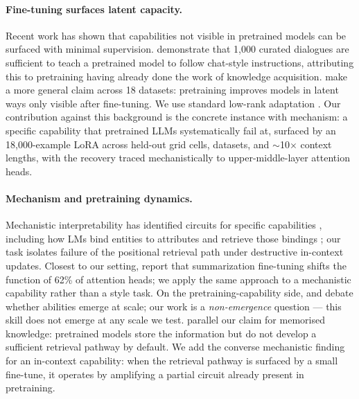 \documentclass[11pt]{article}
\begin{document}
\paragraph{Fine-tuning surfaces latent capacity.}
Recent work has shown that capabilities not visible in pretrained
models can be surfaced with minimal supervision.
\citet{zhou2023lima} demonstrate that 1{,}000 curated dialogues are
sufficient to teach a pretrained model to follow chat-style
instructions, attributing this to pretraining having already done
the work of knowledge acquisition.
\citet{amuro2024finetuning} make a more general claim across 18
datasets: pretraining improves models in latent ways only visible
after fine-tuning.
We use standard low-rank adaptation \citep{hu2021lora,
aghajanyan2021intrinsic}.
Our contribution against this background is the concrete instance
with mechanism: a specific capability that pretrained LLMs
systematically fail at, surfaced by an 18{,}000-example LoRA across
held-out grid cells, datasets, and $\sim$10$\times$ context lengths,
with the recovery traced mechanistically to upper-middle-layer
attention heads.

\paragraph{Mechanism and pretraining dynamics.}
Mechanistic interpretability has identified circuits for specific
capabilities \citep{olsson2022induction, wang2022ioi, conmy2023acdc,
li2025state}, including how LMs bind entities to attributes and
retrieve those bindings \citep{feng2024binding, gurarieh2025mixing};
our task isolates failure of the positional retrieval path under
destructive in-context updates. Closest to our setting, \citet{mishra2025summarization} report that
summarization fine-tuning shifts the function of 62\% of attention
heads; we apply the same approach to a mechanistic capability
rather than a style task.
On the pretraining-capability side, \citet{wei2022emergent} and
\citet{schaeffer2023mirage} debate whether abilities emerge at
scale; our work is a \emph{non-emergence} question --- this skill
does not emerge at any scale we test. \citet{allenzhu2024knowledge}
parallel our claim for memorised knowledge: pretrained models store
the information but do not develop a sufficient retrieval pathway
by default. We add the converse mechanistic finding for an
in-context capability: when the retrieval pathway is surfaced by a
small fine-tune, it operates by amplifying a partial circuit
already present in pretraining.
\end{document}
